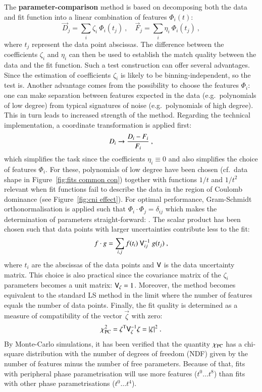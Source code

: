 The {\bf parameter-comparison} method is based on decomposing both the data and fit function into a linear combination of features $\Phi_i(t)$: 
\begin{equation}
\label{eq:parcmp decomposition}
	\vec D_j = \sum_i \zeta_i\ \Phi_i(t_j)\ ,\quad
	\vec F_j = \sum_i \eta_i\ \Phi_i(t_j)\ ,
\end{equation}
where $t_j$ represent the data point abscissas. The difference between the coefficients $\zeta_i$ and $\eta_i$ can then be used to establish the match quality between the data and the fit function. Such a test construction can offer several advantages. Since the estimation of coefficients $\zeta_i$ is likely to be binning-independent, so the test is. Another advantage comes from the possibility to choose the features $\Phi_i$: one can make separation between features expected in the data (e.g.~polynomials of low degree) from typical signatures of noise (e.g.~polynomials of high degree). This in turn leads to increased strength of the method. Regarding the technical implementation, a coordinate transformation is applied first:
\begin{equation}
\label{eq:parcmp transform}
	\vec D_i \rightarrow {\vec D_i - \vec F_i\over \vec F_i}\ ,
\end{equation}
which simplifies the task since the coefficients $\eta_i \equiv 0$ and also simplifies the choice of features $\Phi_i$. For these, polynomials of low degree have been chosen (cf.~data shape in Figure~\ref{fig:fits common con}) together with functions $1/t$ and $1/t^2$ relevant when fit functions fail to describe the data in the region of Coulomb dominance (see Figure~\ref{fig:cni effect}). For optimal performance, Gram-Schmidt orthonormalisation is applied such that $\Phi_i \cdot \Phi_j = \delta_{ij}$ which makes the determination of parameters straight-forward: . The scalar product has been chosen such that data points with larger uncertainties contribute less to the fit:
\begin{equation}
\label{eq:parcmp dot product}
	f \cdot g = \sum_{i, j} f(t_i)\ \mat V^{-1}_{ij}\ g(t_j) \ ,
\end{equation}
where $t_i$ are the abscissas of the data points and $\mathsf{V}$ is the data uncertainty matrix. This choice is also practical since the covariance matrix of the $\zeta_i$ parameters becomes a unit matrix: $\mathsf{V}_{\zeta} = 1$. Moreover, the method becomes equivalent to the standard LS method in the limit where the number of features equals the number of data points. Finally, the fit quality is determined as a measure of compatibility of the vector $\vec\zeta$ with zero:
\begin{equation}
\label{eq:chi sq parcmp}
	\chi_{\rm PC}^2 = \vec\zeta^\T \mat V_{\vec\zeta}^{-1} \vec\zeta = |\vec\zeta|^2 \ .
\end{equation}
By Monte-Carlo simulations, it has been verified that the quantity $\chi_{\rm PC}$ has a chi-square distribution with the number of degrees of freedom (NDF) given by the number of features minus the number of free parameters. Because of that, fits with peripheral phase parametrisation will use more features ($t^0 \ldots t^8$) than fits with other phase parametrisations ($t^0 \ldots t^4$).


